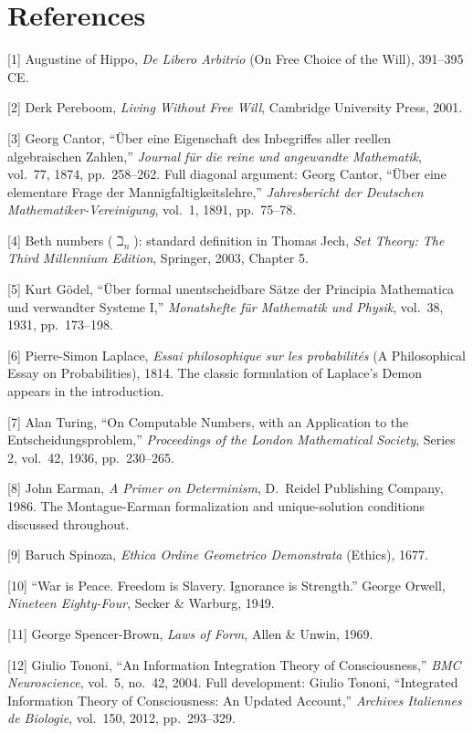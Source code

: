 \documentclass[11pt]{article}
\renewcommand{\\}[1][\mynewlineskip]{\oldnewline[#1]}
\begin{document}
\section*{References}

{[1]} Augustine of Hippo, \textit{De Libero Arbitrio} (On Free Choice of the Will), 391--395 CE.

{[2]} Derk Pereboom, \textit{Living Without Free Will}, Cambridge University Press, 2001.

{[3]} Georg Cantor, ``Über eine Eigenschaft des Inbegriffes aller reellen algebraischen Zahlen,'' \textit{Journal f\"ur die reine und angewandte Mathematik}, vol.\ 77, 1874, pp.\ 258--262. Full diagonal argument: Georg Cantor, ``Über eine elementare Frage der Mannigfaltigkeitslehre,'' \textit{Jahresbericht der Deutschen Mathematiker-Vereinigung}, vol.\ 1, 1891, pp.\ 75--78.

{[4]} Beth numbers ($\beth_n$): standard definition in Thomas Jech, \textit{Set Theory: The Third Millennium Edition}, Springer, 2003, Chapter 5.

{[5]} Kurt Gödel, ``Über formal unentscheidbare S\"atze der Principia Mathematica und verwandter Systeme I,'' \textit{Monatshefte f\"ur Mathematik und Physik}, vol.\ 38, 1931, pp.\ 173--198.

{[6]} Pierre-Simon Laplace, \textit{Essai philosophique sur les probabilités} (A Philosophical Essay on Probabilities), 1814. The classic formulation of Laplace's Demon appears in the introduction.

{[7]} Alan Turing, ``On Computable Numbers, with an Application to the Entscheidungsproblem,'' \textit{Proceedings of the London Mathematical Society}, Series 2, vol.\ 42, 1936, pp.\ 230--265.

{[8]} John Earman, \textit{A Primer on Determinism}, D.\ Reidel Publishing Company, 1986. The Montague-Earman formalization and unique-solution conditions discussed throughout.

{[9]} Baruch Spinoza, \textit{Ethica Ordine Geometrico Demonstrata} (Ethics), 1677.

{[10]} ``War is Peace. Freedom is Slavery. Ignorance is Strength.'' George Orwell, \textit{Nineteen Eighty-Four}, Secker \& Warburg, 1949.

{[11]} George Spencer-Brown, \textit{Laws of Form}, Allen \& Unwin, 1969.

{[12]} Giulio Tononi, ``An Information Integration Theory of Consciousness,'' \textit{BMC Neuroscience}, vol.\ 5, no.\ 42, 2004. Full development: Giulio Tononi, ``Integrated Information Theory of Consciousness: An Updated Account,'' \textit{Archives Italiennes de Biologie}, vol.\ 150, 2012, pp.\ 293--329.
\end{document}
